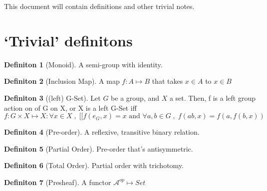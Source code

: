 \documentclass{article}
\theoremstyle{definition}
\theoremstyle{definition}
\newtheorem{definition}{Definiton}[section]
\begin{document}
This document will contain definitions and other trivial notes.
\section{`Trivial' definitons}

\begin{definition}[Monoid] %
	A semi-group with identity.
\end{definition}

\begin{definition}[Inclusion Map] %
	A map $ f:A \mapsto B $ that takes $ x\in A $ to $ x \in B $
\end{definition}

\begin{definition}[(left) G-Set] %
Let $ G $ be a group, and $ X $ a set. Then, f is a left group action on of G on X, or X is a left G-Set iff
\[ f:G \times X \mapsto X : \forall x \in X \; , \;  [ [ f(e_G,x)=x \text{ and } \forall a,b \in G \; , \; f(ab,x)=f(a, f(b,x))  \]
\end{definition}

\begin{definition}[Pre-order] %
	A reflexive, transitive binary relation.
\end{definition}

\begin{definition}[Partial Order] %
Pre-order that's antisymmetric.
\end{definition}

\begin{definition}[Total Order] %
Partial order with trichotomy.
\end{definition}

\begin{definition}[Presheaf] %
	A functor $ \mathcal{A} ^{op} \mapsto Set$
\end{definition}
\end{document}
